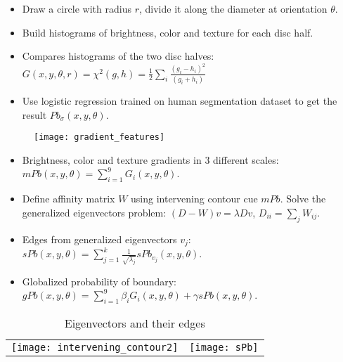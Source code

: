 \documentclass[11pt, a4paper, landscape]{article}
\begin{document}
\NewPage{}
\small
\vfill
\begin{itemize}
\item Draw a circle with radius $r$, divide it along the diameter at orientation $\theta$.
\item Build histograms of brightness, color and texture for each disc half.
\item Compares histograms of the two disc halves: $G(x, y, \theta, r) = \chi ^ 2 (g, h) = \frac{1}{2} \sum_i \frac{(g_i - h_i)^2}{(g_i + h_i)}$
\item Use logistic regression trained on human segmentation dataset to get the result $Pb_{\sigma}(x, y, \theta)$.
\end{itemize}
\begin{figure}
	\centering
	\texttt{[image: gradient\_features]}
\end{figure}
\vfill


\NewPage{}
\small
\vfill
\begin{itemize}
\item Brightness, color and texture gradients in 3 different scales: $mPb(x, y, \theta) = \sum\limits_{i = 1}^{9} G_i(x, y, \theta)$.
\item Define affinity matrix $W$ using intervening contour cue $mPb$. Solve the generalized eigenvectors problem: $(D - W)v = \lambda D v$, $D_{ii} = \sum_j W_{ij}$.
\item Edges from generalized eigenvectors $v_j$: $sPb(x, y, \theta) = \sum\limits_{j = 1}^{k} \frac{1}{\sqrt{\lambda_j}} sPb_{v_j} (x, y, \theta)$.
\item Globalized probability of boundary: $gPb(x, y, \theta) = \sum\limits_{i = 1}^{9} \beta_iG_i(x, y, \theta) + \gamma sPb(x, y, \theta)$.
\end{itemize}
\begin{table}
  \centering
  \begin{tabular}{@{} M{.3\linewidth} M{.7\linewidth} @{}}
      \texttt{[image: intervening\_contour2]}%
      \caption{Intervening contour}%
      &
      \texttt{[image: sPb]}%
      \caption{Eigenvectors and their edges}%
  \end{tabular}
\end{table}
\vfill
\end{document}
